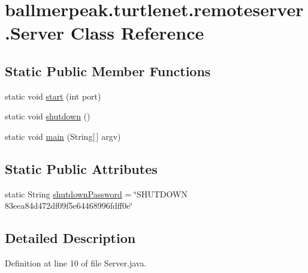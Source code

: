 \hypertarget{classballmerpeak_1_1turtlenet_1_1remoteserver_1_1Server}{\section{ballmerpeak.\-turtlenet.\-remoteserver.\-Server Class Reference}
\label{classballmerpeak_1_1turtlenet_1_1remoteserver_1_1Server}
}
\subsection*{Static Public Member Functions}
\begin{DoxyCompactItemize}
\item 
static void \hyperlink{classballmerpeak_1_1turtlenet_1_1remoteserver_1_1Server_a48f2ebb138b28914f6351e81f84fa02c}{start} (int port)
\item 
static void \hyperlink{classballmerpeak_1_1turtlenet_1_1remoteserver_1_1Server_a884654078b48154feac526fd94a9efe9}{shutdown} ()
\item 
static void \hyperlink{classballmerpeak_1_1turtlenet_1_1remoteserver_1_1Server_a01aebeba4dcef19b48fda4be14b3f433}{main} (String\mbox{[}$\,$\mbox{]} argv)
\end{DoxyCompactItemize}
\subsection*{Static Public Attributes}
\begin{DoxyCompactItemize}
\item 
static String \hyperlink{classballmerpeak_1_1turtlenet_1_1remoteserver_1_1Server_a1e2e63723daf1b2544af8d00be7ba4f0}{shutdown\-Password} = \char`\"{}S\-H\-U\-T\-D\-O\-W\-N 83eea84d472df09f5e64468996fdff0e\char`\"{}
\end{DoxyCompactItemize}


\subsection{Detailed Description}


Definition at line 10 of file Server.\-java.



